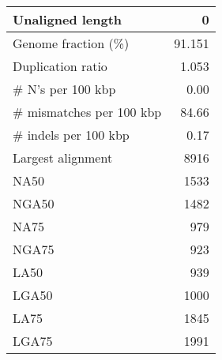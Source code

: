 \documentclass[12pt,a4paper]{article}
\begin{document}
\begin{table}[ht]
\begin{center}
\begin{tabular}{|l*{1}{|r}|}
Unaligned length & 0 \\ \hline
Genome fraction (\%) & 91.151 \\ \hline
Duplication ratio & 1.053 \\ \hline
\# N's per 100 kbp & 0.00 \\ \hline
\# mismatches per 100 kbp & 84.66 \\ \hline
\# indels per 100 kbp & 0.17 \\ \hline
Largest alignment & 8916 \\ \hline
NA50 & 1533 \\ \hline
NGA50 & 1482 \\ \hline
NA75 & 979 \\ \hline
NGA75 & 923 \\ \hline
LA50 & 939 \\ \hline
LGA50 & 1000 \\ \hline
LA75 & 1845 \\ \hline
LGA75 & 1991 \\ \hline
\end{tabular}
\end{center}
\end{table}
\end{document}
